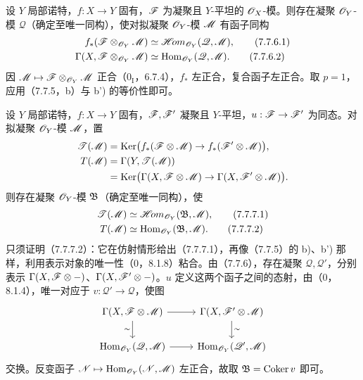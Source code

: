 设 $Y$ 局部诺特，$f:X\to Y$ 固有，$\mathscr F$ 为凝聚且 $Y$-平坦的 $\mathscr O_X$-模。则存在凝聚 $\mathscr O_Y$-模 $\mathscr Q$（确定至唯一同构），使对拟凝聚 $\mathscr O_Y$-模 $\mathscr M$ 有函子同构
\begin{align}
 f_*(\mathscr F\otimes_{\mathscr O_Y}\mathscr M)&\simeq\mathscr{H}\!om_{\mathscr O_Y}(\mathscr Q,\mathscr M),\tag{7.7.6.1}\\
 \Gamma(X,\mathscr F\otimes_{\mathscr O_Y}\mathscr M)&\simeq\operatorname{Hom}_{\mathscr O_Y}(\mathscr Q,\mathscr M).
 \tag{7.7.6.2}
\end{align}
因 $\mathscr M\mapsto\mathscr F\otimes_{\mathscr O_Y}\mathscr M$ 正合（$0_{\mathrm I}$，6.7.4），$f_*$ 左正合，复合函子左正合。取 $p=1$，应用（7.7.5，b）与 b') 的等价性即可。

设 $Y$ 局部诺特，$f:X\to Y$ 固有，$\mathscr F,\mathscr F'$ 凝聚且 $Y$-平坦，$u:\mathscr F\to\mathscr F'$ 为同态。对拟凝聚 $\mathscr O_Y$-模 $\mathscr M$，置
\[
 \begin{aligned}
 \mathscr T(\mathscr M)&=\operatorname{Ker}\bigl(f_*(\mathscr F\otimes\mathscr M)\to f_*(\mathscr F'\otimes\mathscr M)\bigr),\\
 T(\mathscr M)&=\Gamma(Y,\mathscr T(\mathscr M))\\
 &=\operatorname{Ker}\bigl(\Gamma(X,\mathscr F\otimes\mathscr M)\to\Gamma(X,\mathscr F'\otimes\mathscr M)\bigr).
 \end{aligned}
\]
则存在凝聚 $\mathscr O_Y$-模 $\mathfrak B$（确定至唯一同构），使
\begin{align}
 \mathscr T(\mathscr M)&\simeq\mathscr{H}\!om_{\mathscr O_Y}(\mathfrak B,\mathscr M),\tag{7.7.7.1}\\
 T(\mathscr M)&\simeq\operatorname{Hom}_{\mathscr O_Y}(\mathfrak B,\mathscr M).\tag{7.7.7.2}
\end{align}
只须证明（7.7.7.2）：它在仿射情形给出（7.7.7.1），再像（7.7.5）的 b)、b') 那样，利用表示对象的唯一性（0，8.1.8）粘合。由（7.7.6），存在凝聚 $\mathscr Q,\mathscr Q'$，分别表示 $\Gamma(X,\mathscr F\otimes-)$、$\Gamma(X,\mathscr F'\otimes-)$。$u$ 定义这两个函子之间的态射，由（0，8.1.4），唯一对应于 $v:\mathscr Q'\to\mathscr Q$，使图
\[
 \begin{tikzcd}
 \Gamma(X,\F\otimes\M)\arrow[r]\arrow[d,"\sim"']&\Gamma(X,\F'\otimes\M)\arrow[d,"\sim"]\\
 \Hom_{\OO_Y}(\mathscr Q,\M)\arrow[r]&\Hom_{\OO_Y}(\mathscr Q',\M)
 \end{tikzcd}
\]
交换。反变函子 $\mathscr N\mapsto\operatorname{Hom}_{\mathscr O_Y}(\mathscr N,\mathscr M)$ 左正合，故取 $\mathfrak B=\operatorname{Coker} v$ 即可。

